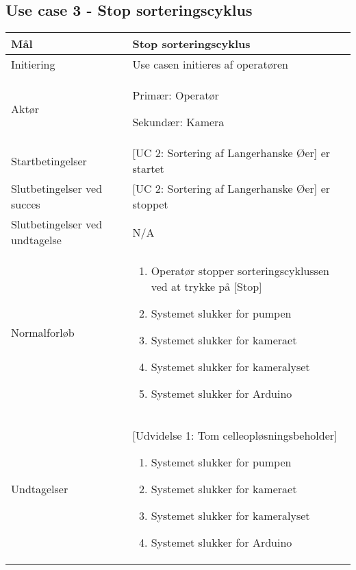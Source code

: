 \subsection{Use case 3 - Stop sorteringscyklus}
\label{uc:3}
\begin{center}
		\begin{longtable}{ | m{4cm} | m{8cm}| } 
			\hline
			Mål & Stop sorteringscyklus \\ 
			\hline
			Initiering &  Use casen initieres af operatøren\\
			\hline
			Aktør & Primær: Operatør
			
			 Sekundær: Kamera \\ 
			\hline
			Startbetingelser & [UC 2: Sortering af Langerhanske Øer] er startet\\ 
			\hline	
			Slutbetingelser ved succes & [UC 2: Sortering af Langerhanske Øer] er stoppet \\
			\hline
			Slutbetingelser ved undtagelse & N/A \\
			\hline
			Normalforløb & \begin{enumerate}
				\item Operatør stopper sorteringscyklussen ved at trykke på [Stop]
				\subitem [Udvidelse 1: Tom celleopløsningsbeholder]
				\item Systemet slukker for pumpen
				\item Systemet slukker for kameraet
				\item Systemet slukker for kameralyset
				\item Systemet slukker for Arduino
			\end{enumerate} \\ 
			\hline
			Undtagelser & [Udvidelse 1: Tom celleopløsningsbeholder]
			
			\begin{enumerate}
			\item Systemet slukker for pumpen
			\item Systemet slukker for kameraet
			\item Systemet slukker for kameralyset
			\item Systemet slukker for Arduino
			\end{enumerate} \\
			\hline
		\end{longtable}
		
	\end{center}
	\pagebreak